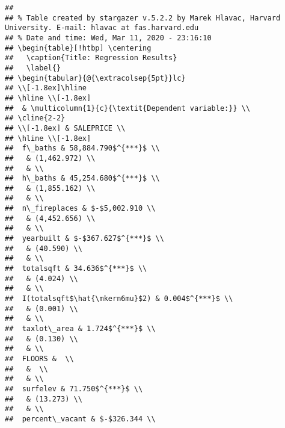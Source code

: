 \documentclass[]{article}
\begin{document}
\begin{verbatim}
## 
## % Table created by stargazer v.5.2.2 by Marek Hlavac, Harvard University. E-mail: hlavac at fas.harvard.edu
## % Date and time: Wed, Mar 11, 2020 - 23:16:10
## \begin{table}[!htbp] \centering 
##   \caption{Title: Regression Results} 
##   \label{} 
## \begin{tabular}{@{\extracolsep{5pt}}lc} 
## \\[-1.8ex]\hline 
## \hline \\[-1.8ex] 
##  & \multicolumn{1}{c}{\textit{Dependent variable:}} \\ 
## \cline{2-2} 
## \\[-1.8ex] & SALEPRICE \\ 
## \hline \\[-1.8ex] 
##  f\_baths & 58,884.790$^{***}$ \\ 
##   & (1,462.972) \\ 
##   & \\ 
##  h\_baths & 45,254.680$^{***}$ \\ 
##   & (1,855.162) \\ 
##   & \\ 
##  n\_fireplaces & $-$5,002.910 \\ 
##   & (4,452.656) \\ 
##   & \\ 
##  yearbuilt & $-$367.627$^{***}$ \\ 
##   & (40.590) \\ 
##   & \\ 
##  totalsqft & 34.636$^{***}$ \\ 
##   & (4.024) \\ 
##   & \\ 
##  I(totalsqft$\hat{\mkern6mu}$2) & 0.004$^{***}$ \\ 
##   & (0.001) \\ 
##   & \\ 
##  taxlot\_area & 1.724$^{***}$ \\ 
##   & (0.130) \\ 
##   & \\ 
##  FLOORS &  \\ 
##   &  \\ 
##   & \\ 
##  surfelev & 71.750$^{***}$ \\ 
##   & (13.273) \\ 
##   & \\ 
##  percent\_vacant & $-$326.344 \\ 

\end{verbatim}
\end{document}

